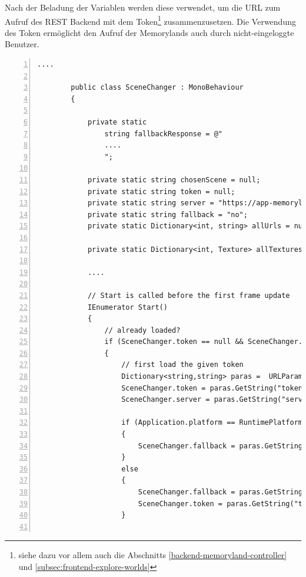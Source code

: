 Nach der Beladung der Variablen werden diese verwendet, um die URL zum Aufruf des REST Backend mit dem Token\footnote{siehe dazu vor allem auch die Abschnitts \ref{backend-memoryland-controller} und \ref{subsec:frontend-explore-worlds}} zusammenzusetzen. Die Verwendung des Token ermöglicht den Aufruf der Memorylands auch durch nicht-eingeloggte Benutzer.



\begin{lstlisting}[numbers=left,caption={SceneChanger - Start},label={lst:unity-scene-changer-start}]
        ....
        
        public class SceneChanger : MonoBehaviour
        {
        
            private static 
                string fallbackResponse = @"
                ....
                ";
        
            private static string chosenScene = null;
            private static string token = null;
            private static string server = "https://app-memoryland.azurewebsites.net";
            private static string fallback = "no";
            private static Dictionary<int, string> allUrls = null;
        
            private static Dictionary<int, Texture> allTextures = new Dictionary<int, Texture> ();
        
            ....                
        
            // Start is called before the first frame update
            IEnumerator Start()
            {
                // already loaded?
                if (SceneChanger.token == null && SceneChanger.chosenScene == null) 
                {
                    // first load the given token
                    Dictionary<string,string> paras =  URLParameters.GetSearchParameters();
                    SceneChanger.token = paras.GetString("token", "");
                    SceneChanger.server = paras.GetString("server", "https://app-memoryland.azurewebsites.net");
                    
                    if (Application.platform == RuntimePlatform.WebGLPlayer)
                    {
                        SceneChanger.fallback = paras.GetString("fallback", "no");
                    }
                    else
                    {
                        SceneChanger.fallback = paras.GetString("fallback", "no");
                        SceneChanger.token = paras.GetString("token", "1920cf9e-b295-4c80-b347-75eff21a71f6");
                    }
                    

\end{lstlisting}
